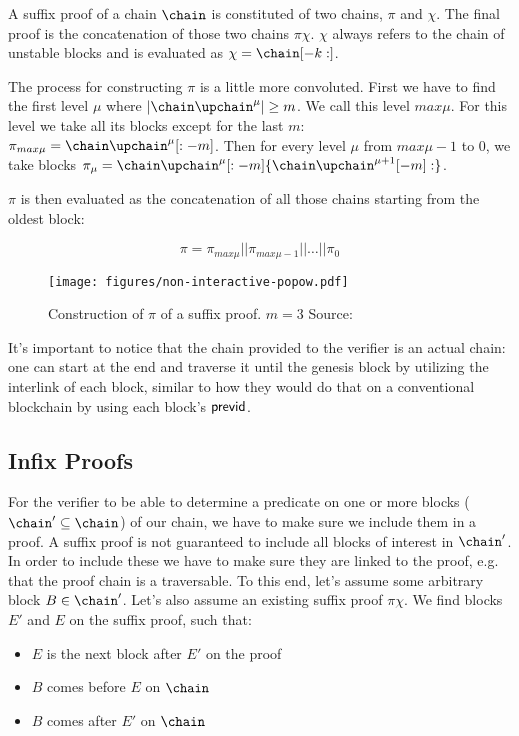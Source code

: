 A suffix proof of a chain $\chain$ is constituted of two chains, $\pi$ and $\chi$. The final proof is the concatenation of those two chains $\pi \chi$. $\chi$ always refers to the chain of unstable blocks and is evaluated as $\chi = \chain[-k:]$.

The process for constructing $\pi$ is a little more convoluted. First we have to find the first level $\mu$ where $|\chain\upchain^\mu| \ge m$. We call this level $max\mu$. For this level we take all its blocks except for the last $m$: $\pi_{max\mu} = \chain\upchain^\mu[:-m]$. Then for every level $\mu$ from $max\mu - 1$ to $0$, we take blocks $\pi_\mu = \chain\upchain^\mu [:-m]\{\chain\upchain^{\mu+1}[-m]:\}$.

$\pi$ is then evaluated as the concatenation of all those chains starting from the oldest block:

$$ \pi = \pi_{max\mu} || \pi_{max\mu-1} || \ldots || \pi_0 $$

\begin{figure}
  \centering
  \texttt{[image: figures/non-interactive-popow.pdf]}
  \caption{Construction of $\pi$ of a suffix proof. $m=3$  Source:~\cite{nipopows}}
  \label{fig:suffix-proof}
\end{figure}

It's important to notice that the chain provided to the verifier is an actual chain: one can start at the end and traverse it until the genesis block by utilizing the interlink of each block, similar to how they would do that on a conventional blockchain by using each block's $\sf previd$.

\subsection{Infix Proofs}
\label{ssec:infix}
For the verifier to be able to determine a predicate on one or more blocks ($\chain' \subseteq \chain$) of our chain, we have to make sure we include them in a proof. A suffix proof is not guaranteed to include all blocks of interest in $\chain'$. In order to include these we have to make sure they are linked to the proof, e.g. that the proof chain is a traversable. To this end, let's assume some arbitrary block $B \in \chain'$. Let's also assume an existing suffix proof $\pi\chi$. We find blocks $E'$ and $E$ on the suffix proof, such that:

\begin{itemize}
  \item $E$ is the next block after $E'$ on the proof
  \item $B$ comes before $E$ on $\chain$
  \item $B$ comes after $E'$ on $\chain$
\end{itemize}

